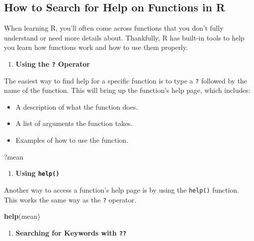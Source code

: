 \documentclass[
]{book}
\newenvironment{Shaded}{\begin{snugshade}}{\end{snugshade}}
\newcommand{\FunctionTok}[1]{\textcolor[rgb]{0.13,0.29,0.53}{\textbf{#1}}}
\newcommand{\NormalTok}[1]{#1}
\providecommand{\tightlist}{%
  \setlength{\itemsep}{0pt}\setlength{\parskip}{0pt}}
\begin{document}
\subsection{How to Search for Help on Functions in R}\label{how-to-search-for-help-on-functions-in-r}

When learning R, you'll often come across functions that you don't fully understand or need more details about. Thankfully, R has built-in tools to help you learn how functions work and how to use them properly.

\begin{enumerate}
\def\labelenumi{\arabic{enumi}.}
\tightlist
\item
  \textbf{Using the \texttt{?} Operator}
\end{enumerate}

The easiest way to find help for a specific function is to type a \texttt{?} followed by the name of the function. This will bring up the function's help page, which includes:

\begin{itemize}
\item
  A description of what the function does.
\item
  A list of arguments the function takes.
\item
  Examples of how to use the function.
\end{itemize}

\begin{Shaded}
\begin{Highlighting}[]
\NormalTok{?mean}
\end{Highlighting}
\end{Shaded}

\begin{enumerate}
\def\labelenumi{\arabic{enumi}.}
\setcounter{enumi}{1}
\tightlist
\item
  \textbf{Using \texttt{help()}}
\end{enumerate}

Another way to access a function's help page is by using the \texttt{help()} function. This works the same way as the \texttt{?} operator.

\begin{Shaded}
\begin{Highlighting}[]
\FunctionTok{help}\NormalTok{(mean)}
\end{Highlighting}
\end{Shaded}

\begin{enumerate}
\def\labelenumi{\arabic{enumi}.}
\setcounter{enumi}{2}
\tightlist
\item
  \textbf{Searching for Keywords with \texttt{??}}
\end{enumerate}
\end{document}

